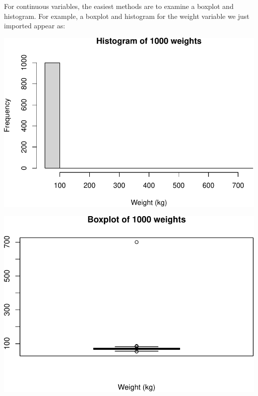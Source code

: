 \documentclass[
]{memoir}
\newenvironment{Shaded}{\begin{snugshade}}{\end{snugshade}}
\newcommand{\AttributeTok}[1]{\textcolor[rgb]{0.77,0.63,0.00}{#1}}
\newcommand{\FunctionTok}[1]{\textcolor[rgb]{0.00,0.00,0.00}{#1}}
\newcommand{\NormalTok}[1]{#1}
\newcommand{\SpecialCharTok}[1]{\textcolor[rgb]{0.00,0.00,0.00}{#1}}
\newcommand{\StringTok}[1]{\textcolor[rgb]{0.31,0.60,0.02}{#1}}
\begin{document}
For continuous variables, the easiest methods are to examine a boxplot and histogram. For example, a boxplot and histogram for the weight variable we just imported appear as:

\begin{Shaded}
\end{Shaded}

\includegraphics{phcm9795-R-notes_files/figure-latex/unnamed-chunk-54-1.pdf}

\begin{Shaded}
\end{Shaded}

\includegraphics{phcm9795-R-notes_files/figure-latex/unnamed-chunk-54-2.pdf}
\end{document}
